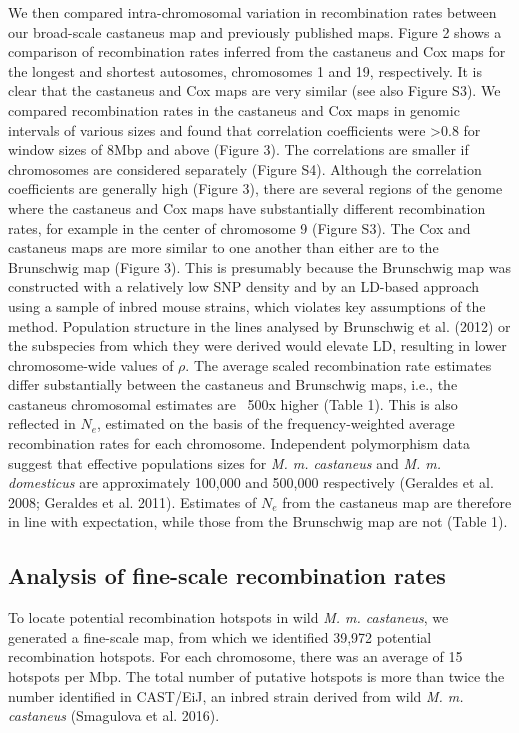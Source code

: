         	We then compared intra-chromosomal variation in recombination rates between our broad-scale castaneus map and previously published maps. Figure 2 shows a comparison of recombination rates inferred from the castaneus and Cox maps for the longest and shortest autosomes, chromosomes 1 and 19, respectively. It is clear that the castaneus and Cox maps are very similar (see also Figure S3). We compared recombination rates in the castaneus and Cox maps in genomic intervals of various sizes and found that correlation coefficients were >0.8 for window sizes of 8Mbp and above (Figure 3). The correlations are smaller if chromosomes are considered separately (Figure S4). Although the correlation coefficients are generally high (Figure 3), there are several regions of the genome where the castaneus and Cox maps have substantially different recombination rates, for example in the center of chromosome 9 (Figure S3). The Cox and castaneus maps are more similar to one another than either are to the Brunschwig map (Figure 3). This is presumably because the Brunschwig map was constructed with a relatively low SNP density and by an LD-based approach using a sample of inbred mouse strains, which violates key assumptions of the method. Population structure in the lines analysed by Brunschwig et al. (2012) or the subspecies from which they were derived would elevate LD, resulting in lower chromosome-wide values of $\rho$. The average scaled recombination rate estimates differ substantially between the castaneus and Brunschwig maps, i.e., the castaneus chromosomal estimates are ~500x higher (Table 1). This is also reflected in $N_e$, estimated on the basis of the frequency-weighted average recombination rates for each chromosome. Independent polymorphism data suggest that effective populations sizes for \textit{M. m. castaneus} and \textit{M. m. domesticus} are approximately 100,000 and 500,000 respectively (Geraldes et al. 2008; Geraldes et al. 2011). Estimates of $N_e$ from the castaneus map are therefore in line with expectation, while those from the Brunschwig map are not (Table 1).

\subsection{Analysis of fine-scale recombination rates }

	To locate potential recombination hotspots in wild \textit{M. m. castaneus}, we generated a fine-scale map, from which we identified 39,972 potential recombination hotspots. For each chromosome, there was an average of 15 hotspots per Mbp. The total number of putative hotspots is more than twice the number identified in CAST/EiJ, an inbred strain derived from wild \textit{M. m. castaneus} (Smagulova et al. 2016).

